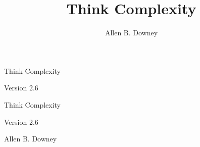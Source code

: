 \documentclass[12pt]{book}
\title{Think Complexity}
\author{Allen B. Downey}
\newcommand{\thetitle}{Think Complexity}
\newcommand{\theauthors}{Allen B. Downey}
\newcommand{\theversion}{2.6}
\theoremstyle{exercise}
\newcommand\blankpage{%
    \null
    \thispagestyle{empty}%
    \addtocounter{page}{-1}%
    \newpage}
\newif\ifplastex
\begin{document}
\frontmatter

\ifplastex

\maketitle

\else

\begin{latexonly}


\thispagestyle{empty}

\begin{flushright}
\vspace*{2.0in}

\begin{spacing}{3}
{\huge \thetitle}
\end{spacing}

\vspace{0.25in}

Version \theversion

\vfill

\end{flushright}


\afterpage{\blankpage}



\pagebreak
\thispagestyle{empty}

\begin{flushright}
\vspace*{2.0in}

\begin{spacing}{3}
{\huge \thetitle}
\end{spacing}

\vspace{0.25in}

Version \theversion

\vspace{1in}


{\Large
\theauthors \\
}


\vspace{0.5in}


\end{flushright}
\end{latexonly}
\end{document}
